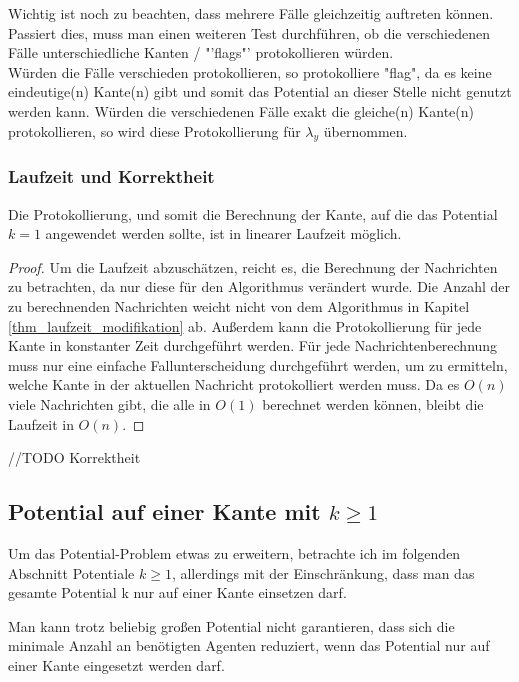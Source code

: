 Wichtig ist noch zu beachten, dass mehrere Fälle gleichzeitig auftreten können. Passiert dies, muss man einen weiteren Test durchführen, ob die verschiedenen Fälle unterschiedliche Kanten / "'flags"' protokollieren würden.
\\
Würden die Fälle verschieden protokollieren, so protokolliere "flag", da es keine eindeutige(n) Kante(n) gibt und somit das Potential an dieser Stelle nicht genutzt werden kann. Würden die verschiedenen Fälle exakt die gleiche(n) Kante(n) protokollieren, so wird diese Protokollierung für $\lambda_{y}$ übernommen.


\subsubsection{Laufzeit und Korrektheit}


	\begin{theorem}
		Die Protokollierung, und somit die Berechnung der Kante, auf die das Potential $k=1$ angewendet werden sollte, ist in linearer Laufzeit möglich.
	\end{theorem}
	\begin{proof}
		Um die Laufzeit abzuschätzen, reicht es, die Berechnung der Nachrichten zu betrachten, da nur diese für den Algorithmus verändert wurde. Die Anzahl der zu berechnenden Nachrichten weicht nicht von dem Algorithmus in Kapitel \ref{thm_laufzeit_modifikation} ab. Außerdem kann die Protokollierung für jede Kante in konstanter Zeit durchgeführt werden. Für jede Nachrichtenberechnung muss nur eine einfache Fallunterscheidung durchgeführt werden, um zu ermitteln, welche Kante in der aktuellen Nachricht protokolliert werden muss. Da es $O(n)$ viele Nachrichten gibt, die alle in $O(1)$ berechnet werden können, bleibt die Laufzeit in $O(n)$.
	\end{proof}
	
	
	//TODO Korrektheit


\subsection{Potential auf einer Kante mit $k \geq 1$}\label{kap_pot>=1}


Um das Potential-Problem etwas zu erweitern, betrachte ich im folgenden Abschnitt Potentiale $k \geq 1$, allerdings mit der Einschränkung, dass man das gesamte Potential k nur auf einer Kante einsetzen darf.

\begin{theorem}
	Man kann trotz beliebig großen Potential nicht garantieren, dass sich die minimale Anzahl an benötigten Agenten reduziert, wenn das Potential nur auf einer Kante eingesetzt werden darf.
\end{theorem}

